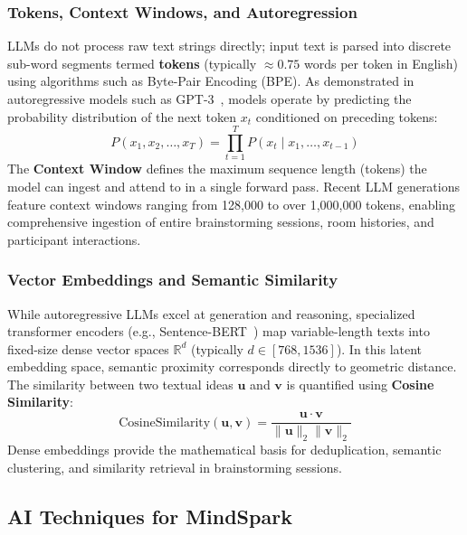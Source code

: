 \subsubsection{Tokens, Context Windows, and Autoregression}
LLMs do not process raw text strings directly; input text is parsed into discrete sub-word segments termed \textbf{tokens} (typically $\approx 0.75$ words per token in English) using algorithms such as Byte-Pair Encoding (BPE). As demonstrated in autoregressive models such as GPT-3~\cite{brown2020language}, models operate by predicting the probability distribution of the next token $x_t$ conditioned on preceding tokens:
\begin{equation}
    P(x_1, x_2, \dots, x_T) = \prod_{t=1}^T P(x_t \mid x_1, \dots, x_{t-1})
\end{equation}
\noindent The \textbf{Context Window} defines the maximum sequence length (tokens) the model can ingest and attend to in a single forward pass. Recent LLM generations feature context windows ranging from 128,000 to over 1,000,000 tokens, enabling comprehensive ingestion of entire brainstorming sessions, room histories, and participant interactions.

\subsubsection{Vector Embeddings and Semantic Similarity}
While autoregressive LLMs excel at generation and reasoning, specialized transformer encoders (e.g., Sentence-BERT~\cite{reimers2019sentencebert}) map variable-length texts into fixed-size dense vector spaces $\mathbb{R}^d$ (typically $d \in [768, 1536]$). In this latent embedding space, semantic proximity corresponds directly to geometric distance. The similarity between two textual ideas $\mathbf{u}$ and $\mathbf{v}$ is quantified using \textbf{Cosine Similarity}:
\begin{equation}
    \text{CosineSimilarity}(\mathbf{u}, \mathbf{v}) = \frac{\mathbf{u} \cdot \mathbf{v}}{\|\mathbf{u}\|_2 \|\mathbf{v}\|_2}
\end{equation}
\noindent Dense embeddings provide the mathematical basis for deduplication, semantic clustering, and similarity retrieval in brainstorming sessions.


\subsection{AI Techniques for MindSpark}
\label{subsec:ai_techniques}

